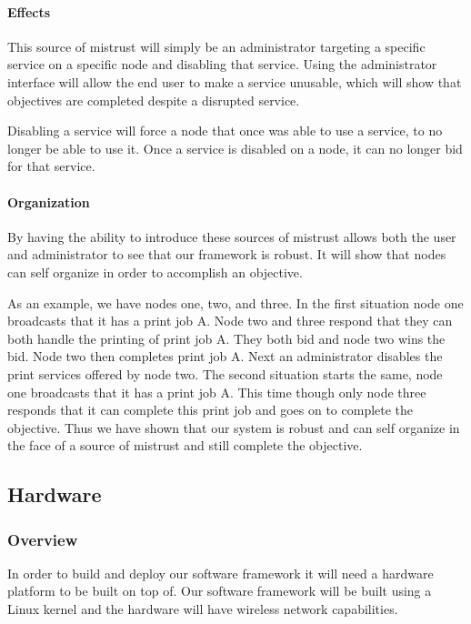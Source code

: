 \paragraph{Effects}
This source of mistrust will simply be an administrator targeting a specific service on a specific node and disabling that service. Using the administrator interface will allow the end user to make a service unusable, which will show that objectives are completed despite a disrupted service.

Disabling a service will force a node that once was able to use a service, to no longer be able to use it. Once a service is disabled on a node, it can no longer bid for that service.

\paragraph{Organization}
By having the ability to introduce these sources of mistrust allows both the user and administrator to see that our framework is robust. It will show that nodes can self organize in order to accomplish an objective.

As an example, we have nodes one, two, and three. In the first situation node one broadcasts that it has a print job A. Node two and three respond that they can both handle the printing of print job A. They both bid and node two wins the bid. Node two then completes print job A. Next an administrator disables the print services offered by node two. The second situation starts the same, node one broadcasts that it has a print job A. This time though only node three responds that it can complete this print job and goes on to complete the objective. Thus we have shown that our system is robust and can self organize in the face of a source of mistrust and still complete the objective.
			




\subsection{Hardware}
\subsubsection{Overview} 
In order to build and deploy our software framework it will need a hardware platform to be built on top of. Our software framework will be built using a Linux kernel and the hardware will have wireless network capabilities. 

